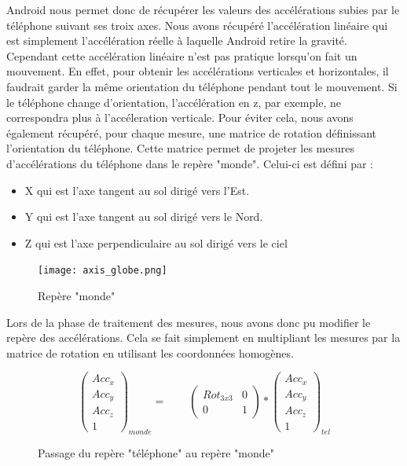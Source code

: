 \documentclass[12pt, french]{article}
\begin{document}
Android nous permet donc de récupérer les valeurs des accélérations subies par le téléphone suivant ses troix axes. Nous avons récupéré l'accélération linéaire qui est simplement l'accélération réelle à laquelle Android retire la gravité. Cependant cette accélération linéaire n'est pas pratique lorsqu'on fait un mouvement. En effet, pour obtenir les accélérations verticales et horizontales, il faudrait garder la même orientation du téléphone pendant tout le mouvement. Si le téléphone change d'orientation, l'accélération en z, par exemple, ne correspondra plus à l'accéleration verticale. Pour éviter cela, nous avons également récupéré, pour chaque mesure, une matrice de rotation définissant l'orientation du téléphone. Cette matrice permet de projeter les mesures d'accélérations du téléphone dans le repère "monde". Celui-ci est défini par :
\begin{itemize}
\item X qui est l'axe tangent au sol dirigé vers l'Est.
\item Y qui est l'axe tangent au sol dirigé vers le Nord.
\item Z  qui  est l'axe perpendiculaire au sol dirigé vers le ciel
\end{itemize}

\begin{figure}[H]
\centering
\texttt{[image: axis\_globe.png]}
\caption{Repère "monde"}
\label{fig2}
\end{figure}

Lors de la phase de traitement des mesures, nous avons donc pu modifier le repère des accélérations. Cela se fait simplement en multipliant les mesures par la matrice de rotation en utilisant les coordonnées homogènes. 
\begin{figure}[H]
\[\left( 
\begin{array}{c}
Acc_x  \\
Acc_y  \\
Acc_z  \\
1 \end{array} 
\right)_{monde}=\qquad
\left( 
\begin{array}{cc}
Rot_{3x3} & 0  \\
0 & 1  \end{array} 
\right)*\left( 
\begin{array}{c}
Acc_x  \\
Acc_y  \\
Acc_z  \\
1\end{array} 
\right)_{tel}\]
\caption{Passage du repère "téléphone" au repère "monde"}
\end{figure}
\end{document}
